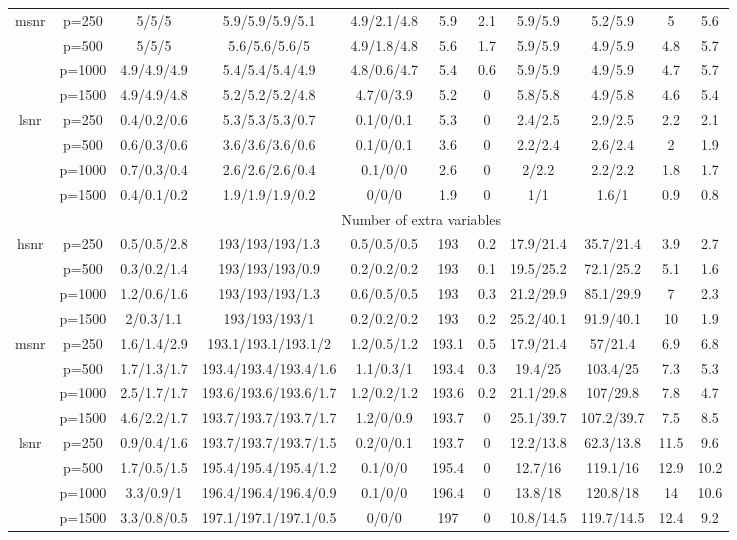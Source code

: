 \begin{table}[ht]
{\begin{tabular}{|c|c|ccccccccc|}
  \midrule\multirow{4}[2]{*}{msnr} & p=250 & 5/5/5 & 5.9/5.9/5.9/5.1 & 4.9/2.1/4.8 & 5.9 & 2.1 & 5.9/5.9 & 5.2/5.9 & 5 & 5.6 \\ 
   & p=500 & 5/5/5 & 5.6/5.6/5.6/5 & 4.9/1.8/4.8 & 5.6 & 1.7 & 5.9/5.9 & 4.9/5.9 & 4.8 & 5.7 \\ 
   & p=1000 & 4.9/4.9/4.9 & 5.4/5.4/5.4/4.9 & 4.8/0.6/4.7 & 5.4 & 0.6 & 5.9/5.9 & 4.9/5.9 & 4.7 & 5.7 \\ 
   & p=1500 & 4.9/4.9/4.8 & 5.2/5.2/5.2/4.8 & 4.7/0/3.9 & 5.2 & 0 & 5.8/5.8 & 4.9/5.8 & 4.6 & 5.4 \\ 
  \midrule\multirow{4}[2]{*}{lsnr} & p=250 & 0.4/0.2/0.6 & 5.3/5.3/5.3/0.7 & 0.1/0/0.1 & 5.3 & 0 & 2.4/2.5 & 2.9/2.5 & 2.2 & 2.1 \\ 
   & p=500 & 0.6/0.3/0.6 & 3.6/3.6/3.6/0.6 & 0.1/0/0.1 & 3.6 & 0 & 2.2/2.4 & 2.6/2.4 & 2 & 1.9 \\ 
   & p=1000 & 0.7/0.3/0.4 & 2.6/2.6/2.6/0.4 & 0.1/0/0 & 2.6 & 0 & 2/2.2 & 2.2/2.2 & 1.8 & 1.7 \\ 
   & p=1500 & 0.4/0.1/0.2 & 1.9/1.9/1.9/0.2 & 0/0/0 & 1.9 & 0 & 1/1 & 1.6/1 & 0.9 & 0.8 \\ 
   \midrule 
 \multicolumn{1}{|c}{} &       & \multicolumn{9}{c|}{Number of extra variables} \\
\midrule\multirow{4}[2]{*}{hsnr} & p=250 & 0.5/0.5/2.8 & 193/193/193/1.3 & 0.5/0.5/0.5 & 193 & 0.2 & 17.9/21.4 & 35.7/21.4 & 3.9 & 2.7 \\ 
   & p=500 & 0.3/0.2/1.4 & 193/193/193/0.9 & 0.2/0.2/0.2 & 193 & 0.1 & 19.5/25.2 & 72.1/25.2 & 5.1 & 1.6 \\ 
   & p=1000 & 1.2/0.6/1.6 & 193/193/193/1.3 & 0.6/0.5/0.5 & 193 & 0.3 & 21.2/29.9 & 85.1/29.9 & 7 & 2.3 \\ 
   & p=1500 & 2/0.3/1.1 & 193/193/193/1 & 0.2/0.2/0.2 & 193 & 0.2 & 25.2/40.1 & 91.9/40.1 & 10 & 1.9 \\ 
  \midrule\multirow{4}[2]{*}{msnr} & p=250 & 1.6/1.4/2.9 & 193.1/193.1/193.1/2 & 1.2/0.5/1.2 & 193.1 & 0.5 & 17.9/21.4 & 57/21.4 & 6.9 & 6.8 \\ 
   & p=500 & 1.7/1.3/1.7 & 193.4/193.4/193.4/1.6 & 1.1/0.3/1 & 193.4 & 0.3 & 19.4/25 & 103.4/25 & 7.3 & 5.3 \\ 
   & p=1000 & 2.5/1.7/1.7 & 193.6/193.6/193.6/1.7 & 1.2/0.2/1.2 & 193.6 & 0.2 & 21.1/29.8 & 107/29.8 & 7.8 & 4.7 \\ 
   & p=1500 & 4.6/2.2/1.7 & 193.7/193.7/193.7/1.7 & 1.2/0/0.9 & 193.7 & 0 & 25.1/39.7 & 107.2/39.7 & 7.5 & 8.5 \\ 
  \midrule\multirow{4}[2]{*}{lsnr} & p=250 & 0.9/0.4/1.6 & 193.7/193.7/193.7/1.5 & 0.2/0/0.1 & 193.7 & 0 & 12.2/13.8 & 62.3/13.8 & 11.5 & 9.6 \\ 
   & p=500 & 1.7/0.5/1.5 & 195.4/195.4/195.4/1.2 & 0.1/0/0 & 195.4 & 0 & 12.7/16 & 119.1/16 & 12.9 & 10.2 \\ 
   & p=1000 & 3.3/0.9/1 & 196.4/196.4/196.4/0.9 & 0.1/0/0 & 196.4 & 0 & 13.8/18 & 120.8/18 & 14 & 10.6 \\ 
   & p=1500 & 3.3/0.8/0.5 & 197.1/197.1/197.1/0.5 & 0/0/0 & 197 & 0 & 10.8/14.5 & 119.7/14.5 & 12.4 & 9.2 \\ 
   \bottomrule 
\end{tabular}
}
\end{table}
